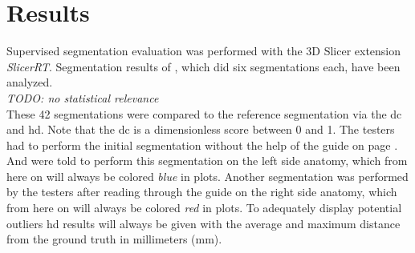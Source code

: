 \chapter{Results}\label{c:resuls}
Supervised segmentation evaluation was performed with the 3D Slicer extension \textit{SlicerRT}.
Segmentation results of \noTesters, which did six segmentations each, have been analyzed.\\
\textit{TODO: no statistical relevance}\\
These 42 segmentations were compared to the reference segmentation via the \acrlong{dc} and \acrlong{hd}.
Note that the \acrlong{dc} is a dimensionless score between 0 and 1.
The testers had to perform the initial segmentation without the help of the guide on page \pageref{a:guide}.
And were told to perform this segmentation on the left side anatomy,
which from here on will always be colored \textit{blue} in plots.
Another segmentation was performed by the testers after reading through the guide on the right side anatomy,
which from here on will always be colored \textit{red} in plots.
To adequately display potential outliers \acrfull{hd} results will always be given with the average and maximum distance from the ground truth in millimeters (mm).


